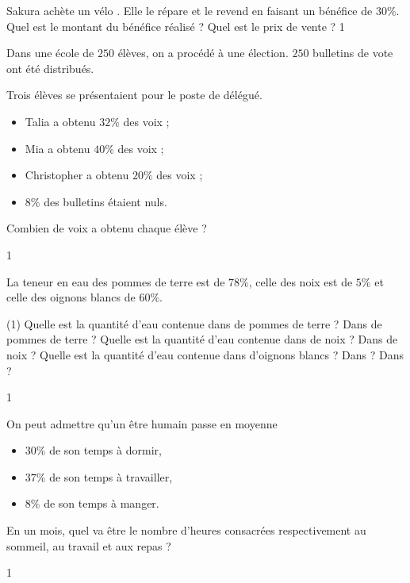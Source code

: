 \documentclass[a4paper,11pt]{report}
\begin{document}
\begin{exo}{
Sakura achète un vélo . Elle le répare et le revend en faisant un bénéfice de $30\%$.
Quel est le montant du bénéfice réalisé ? Quel est le prix de vente ?
}{1}
\end{exo}

\begin{exo}{
Dans une école de $250$ élèves, on a procédé à une élection. $250$ bulletins de vote ont été distribués. 

Trois élèves se présentaient pour le poste de délégué.

\begin{itemize}
    \item Talia a obtenu $32\%$ des voix ;
    \item Mia a obtenu $40\%$ des voix ;
    \item Christopher a obtenu $20\%$ des voix ;
    \item $8\%$ des bulletins étaient nuls.
\end{itemize}

Combien de voix a obtenu chaque élève ?
}{1}    
\end{exo}

\begin{exo}{
La teneur en eau des pommes de terre est de $78\%$, celle des noix est de $5\%$ et celle des oignons blancs de $60\%$.
\begin{tasks}(1)
    \task Quelle est la quantité d'eau contenue dans  de pommes de terre ? Dans  de pommes de terre ?
    \task Quelle est la quantité d'eau contenue dans  de noix ? Dans  de noix ?
    \task Quelle est la quantité d'eau contenue dans  d'oignons blancs ? Dans  ? Dans  ?
\end{tasks}
}{1}    
\end{exo}


\begin{exo}{
On peut admettre qu'un être humain passe en moyenne
\begin{itemize}
    \item $30\%$ de son temps à dormir,
    \item $37\%$ de son temps à travailler,
    \item $8\%$ de son temps à manger.
\end{itemize}
En un mois, quel va être le nombre d'heures consacrées respectivement au sommeil, au travail et aux repas ?
}{1}    
\end{exo}
\end{document}
